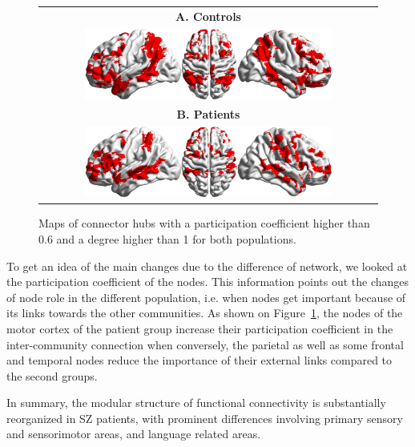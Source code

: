 \begin{figure}[t!]
\centering
    \begin{tabular}{c}
    \textbf{\textsf{A. Controls}} \\
    \includegraphics[width=0.75\textwidth]{images/schizo/SchizoControl_Surprise_MaskPat_0-6_Deg_1.jpg} \\
    \textbf{\textsf{B. Patients}} \\
    \includegraphics[width=0.75\textwidth]{images/schizo/SchizoPatient_Surprise_MaskPat_0-6_Deg_1.jpg}
    \end{tabular}
\caption{Maps of connector hubs with a participation coefficient higher than 0.6 and a degree higher than 1 for both populations.}
\label{fig:schizo_figure7}
\end{figure}

To get an idea of the main changes due to the difference of network, we looked at the participation coefficient of the nodes.
This information points out the changes of node role in the different population, i.e. when nodes get important because of its links towards the other communities.
As shown on Figure~\ref{fig:schizo_figure7}, the nodes of the motor cortex of the patient group increase their participation coefficient in the inter-community connection when conversely, the parietal as well as some frontal and temporal nodes reduce the importance of their external links compared to the second groups.

In summary, the modular structure of functional connectivity is substantially reorganized in SZ patients, with prominent differences involving primary sensory and sensorimotor areas, and language related areas. 

